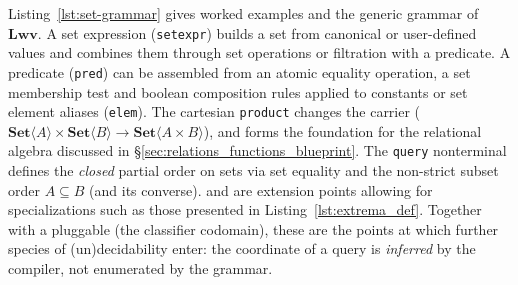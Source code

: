 \documentclass[11pt, a4paper]{article}
\begin{document}
Listing~\ref{lst:set-grammar} gives worked examples and the generic grammar of $\mathbf{Lwv}$.
A set expression (\texttt{setexpr}) builds a set from canonical or user-defined values and combines them through set operations or filtration with a predicate.
A predicate (\texttt{pred}) can be assembled from an atomic equality operation, a set membership test and boolean composition rules applied to constants or set element aliases (\texttt{elem}).
The cartesian \texttt{product}  changes the carrier ($\mathbf{Set}\langle A\rangle \times \mathbf{Set}\langle B\rangle \to \mathbf{Set}\langle A \times B\rangle$), and forms the foundation for the relational algebra discussed in §\ref{sec:relations_functions_blueprint}.
The \texttt{query} nonterminal defines the \emph{closed} partial order on sets via set equality and the non-strict subset order $A \subseteq B$ (and its converse).
 and  are extension points allowing for specializations such as those presented in Listing~\ref{lst:extrema_def}.
Together with a pluggable  (the classifier codomain), these are the points at which further species of (un)decidability enter: the coordinate of a query is \emph{inferred} by the compiler, not enumerated by the grammar.
\end{document}
